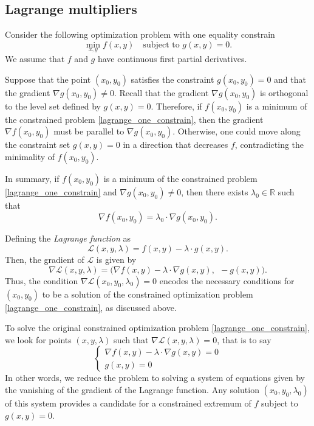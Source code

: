 \documentclass{amsart}
\newcommand{\R}{\mathbb{R}}
\begin{document}
\subsection{Lagrange multipliers}

Consider the following optimization problem with one equality constrain
\begin{equation}
    \label{lagrange_one_constrain}
    \min_{x,y} f(x,y) \quad \text{subject to } g(x,y)= 0.
\end{equation}
We assume that $f$ and $g$ have continuous first partial derivatives.

\bigskip

Suppose that the point $(x_0,y_0)$ satisfies  the constraint $g(x_0,y_0)=0$ and that the gradient $\nabla g(x_0,y_0)\neq 0$. Recall that the gradient $\nabla g(x_0,y_0)$ is orthogonal to the level set defined by $g(x,y)=0$. Therefore, if $f(x_0,y_0)$ is a minimum of the constrained problem \eqref{lagrange_one_constrain}, then the gradient $\nabla f(x_0,y_0)$ must be parallel to $\nabla g(x_0,y_0)$. Otherwise, one could move along the constraint set $g(x,y)=0$ in a direction that decreases $f$, contradicting the minimality of $f(x_0,y_0)$.

In summary, if $f(x_0,y_0)$ is a minimum of the constrained problem \eqref{lagrange_one_constrain} and $\nabla g(x_0,y_0)\neq 0$, then there exists $\lambda_0\in\R$ such that
\[
    \nabla f(x_0,y_0)= \lambda_0\cdot \nabla g(x_0,y_0).
\]

\bigskip

Defining the {\it Lagrange function} as
\[
    \mathcal{L}(x,y,\lambda)= f(x,y) -\lambda\cdot g(x,y).
\]
Then, the gradient of $\mathcal{L}$ is given by
\[
    \nabla\mathcal{L}(x,y,\lambda)=
    \Big(
        \nabla f(x,y) -\lambda\cdot \nabla g(x,y),\ \
        -g(x,y)
    \Big).
\]
Thus, the condition $\nabla\mathcal{L}(x_0,y_0,\lambda_0)=0$ encodes the necessary conditions for $(x_0,y_0)$ to be a solution of the constrained optimization problem \eqref{lagrange_one_constrain}, as discussed above.

\bigskip

To solve the original constrained optimization problem \eqref{lagrange_one_constrain}, we look for points $(x,y,\lambda)$ such that $\nabla\mathcal{L}(x,y,\lambda)=0$, that is to say
\[\begin{cases}
    \nabla f(x,y) -\lambda\cdot \nabla g(x,y)= 0\\
    g(x,y)= 0
\end{cases}\]
In other words, we reduce the problem to solving a system of equations given by the vanishing of the gradient of the Lagrange function. Any solution $(x_0,y_0,\lambda_0)$ of this system provides a candidate for a constrained extremum of $f$ subject to $g(x,y)=0$.
\end{document}
